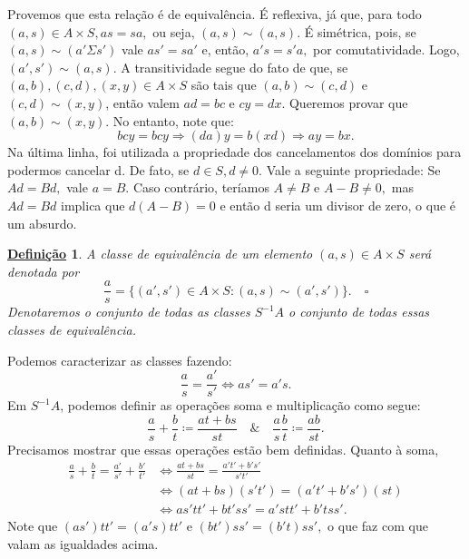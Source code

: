 \documentclass{article}
\newtheorem*{def*}{\underline{Defini\c c\~ao}}
\begin{document}
    Provemos que esta relação é de equivalência. É reflexiva, já que, para todo
    \((a, s)\in A\times S, as = sa,\) ou seja, \((a, s)\sim (a, s).\) É simétrica, pois,
    se \((a, s)\sim (a'\Sigma s')\) vale \(as' = sa'\) e, então, \(a's = s'a, \) por comutatividade. 
    Logo, \((a', s')\sim (a, s).\) A transitividade segue do fato de que, se \((a, b), (c, d), (x, y)\in A\times S\) são
    tais que \((a, b)\sim (c, d)\) e \((c, d)\sim (x, y)\), então valem \(ad = bc\) e \(cy = dx.\) Queremos provar
    que \((a, b)\sim (x, y)\). No entanto, note que:
    \[
      bcy = bcy \Rightarrow (da)y = b(xd) \Rightarrow ay = bx.
    \]
    Na última linha, foi utilizada a propriedade dos cancelamentos dos domínios para podermos cancelar d. De fato, se \(d\in S, d\neq 0.\)
    Vale a seguinte propriedade: Se \(Ad = Bd,\) vale \(a = B.\) Caso contrário, teríamos \(A\neq B\) e \(A - B\neq 0,\) mas \(Ad = Bd\) implica que
    \(d(A-B) = 0\) e então d seria um divisor de zero, o que é um absurdo.

    \begin{def*}
      A classe de equivalência de um elemento \((a, s)\in A\times S\) será denotada por 
      \[
        \frac{a}{s} = \{(a', s')\in A\times S: (a, s)\sim (a', s')\}.\quad\square
      \] 
      Denotaremos o conjunto de todas as classes \(S^{-1}A\) o conjunto de todas essas classes de equivalência. 
    \end{def*}
    Podemos caracterizar as classes fazendo:
    \[
      \frac{a}{s} = \frac{a'}{s'} \Longleftrightarrow as'=a's.
    \]
    Em \(S^{-1}A\), podemos definir as operações soma e multiplicação como segue:
    \[
      \frac{a}{s}+\frac{b}{t}\coloneqq \frac{at+bs}{st}\quad\&\quad \frac{a}{s}\frac{b}{t}\coloneqq \frac{ab}{st}.
    \]
    Precisamos mostrar que essas operações estão bem definidas. Quanto à soma,
    \begin{align*}
      \frac{a}{s} + \frac{b}{t} = \frac{a'}{s'} + \frac{b'}{t'} &\Longleftrightarrow \frac{at+bs}{st} = \frac{a't' + b's'}{s't'}\\
                                                                &\Longleftrightarrow (at+bs)(s't') = (a't'+b's')(st)\\
                                                                &\Longleftrightarrow as't t'+bt'ss' = a'st t' + b'tss'.
    \end{align*}
    Note que \((as')t t' = (a's)t t'\) e \((bt')ss' = (b't)ss',\) o que faz com que valam as igualdades acima.
\end{document}
